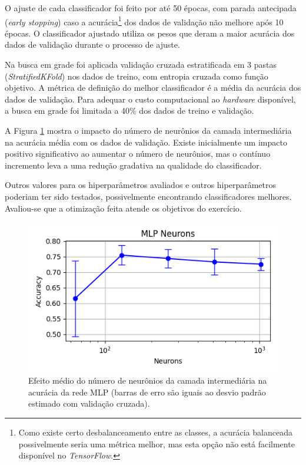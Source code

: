 \documentclass[final,5p]{elsarticle}
\numberwithin{equation}{section}
\begin{document}
    O ajuste de cada classificador foi feito por até 50 épocas, com parada antecipada (\emph{early stopping}) caso a acurácia\footnote{Como existe certo desbalanceamento entre as classes, a acurácia balanceada possivelmente seria uma métrica melhor, mas esta opção não está facilmente disponível no \emph{TensorFlow}.} dos dados de validação não melhore após 10 épocas. O classificador ajustado utiliza os pesos que deram a maior acurácia dos dados de validação durante o processo de ajuste.

    Na busca em grade foi aplicada validação cruzada estratificada em 3 pastas (\emph{StratifiedKFold}) nos dados de treino, com entropia cruzada como função objetivo. A métrica de definição do melhor classificador é a média da acurácia dos dados de validação. Para adequar o custo computacional ao \emph{hardware} disponível, a busca em grade foi limitada a 40\% dos dados de treino e validação.

    A Figura \ref{fig:NeuroniosMLP} mostra o impacto do número de neurônios da camada intermediária na acurácia média com os dados de validação. Existe inicialmente um impacto positivo significativo ao aumentar o número de neurônios, mas o contínuo incremento leva a uma redução gradativa na qualidade do classificador.

    Outros valores para os hiperparâmetros avaliados e outros hiperparâmetros poderiam ter sido testados, possivelmente encontrando classificadores melhores. Avaliou-se que a otimização feita atende os objetivos do exercício.

     \begin{figure}[hbt!]
         \includegraphics[width=0.95\columnwidth]{MLP_neurons.png}
         \caption{Efeito médio do número de neurônios da camada intermediária na acurácia da rede MLP (barras de erro são iguais ao desvio padrão estimado com validação cruzada).}\label{fig:NeuroniosMLP}
     \end{figure}
\end{document}
